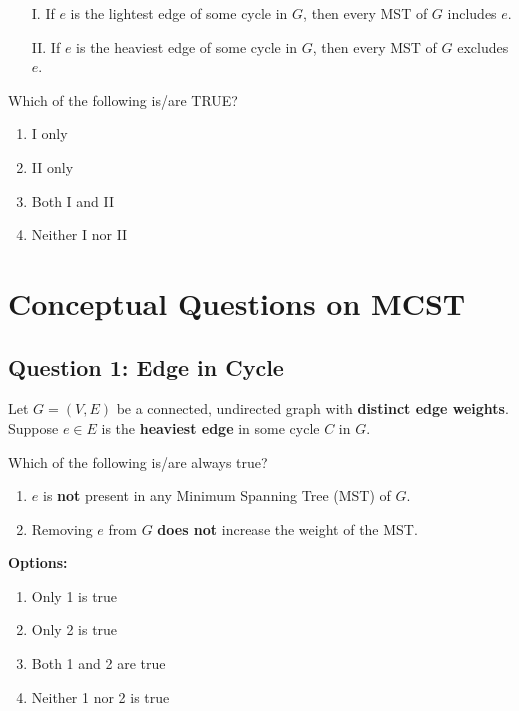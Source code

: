 \begin{itemize}
    \item[I.] If $e$ is the lightest edge of some cycle in $G$, then every MST of $G$ includes $e$.
    \item[II.] If $e$ is the heaviest edge of some cycle in $G$, then every MST of $G$ excludes $e$.
\end{itemize}

Which of the following is/are TRUE?

\begin{enumerate}[label=(\alph*)]
    \item I only
    \item II only
    \item Both I and II
    \item Neither I nor II
\end{enumerate}

\section{Conceptual Questions on MCST}

\subsection*{Question 1: Edge in Cycle}
Let $G = (V, E)$ be a connected, undirected graph with \textbf{distinct edge weights}. Suppose $e \in E$ is the \textbf{heaviest edge} in some cycle $C$ in $G$.

Which of the following is/are always true?
\begin{enumerate}
    \item $e$ is \textbf{not} present in any Minimum Spanning Tree (MST) of $G$.
    \item Removing $e$ from $G$ \textbf{does not} increase the weight of the MST.
\end{enumerate}

\textbf{Options:}
\begin{enumerate}[label=(\alph*)]
    \item Only 1 is true
    \item Only 2 is true
    \item Both 1 and 2 are true
    \item Neither 1 nor 2 is true
\end{enumerate}

